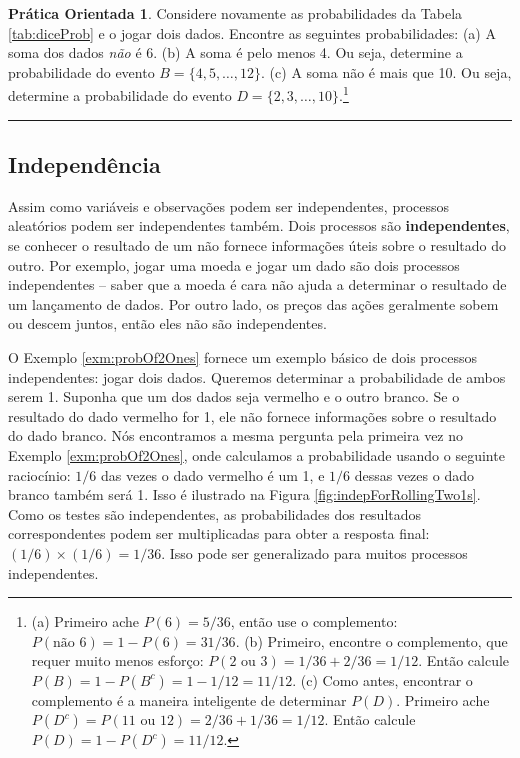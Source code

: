 \documentclass[
]{book}
\theoremstyle{definition}
\theoremstyle{definition}
\theoremstyle{definition}
\newtheorem{exercise}{Prática Orientada}[chapter]
\theoremstyle{definition}
\theoremstyle{remark}
\begin{document}
\begin{exercise}
\protect\hypertarget{exr:unnamed-chunk-54}{}{\label{exr:unnamed-chunk-54} }Considere novamente as probabilidades da Tabela \ref{tab:diceProb} e o jogar dois dados. Encontre as seguintes probabilidades:
(a) A soma dos dados \emph{não} é 6.
(b) A soma é pelo menos 4. Ou seja, determine a probabilidade do evento \(B=\{4, 5, \dots, 12\}\).
(c) A soma não é mais que 10. Ou seja, determine a probabilidade do evento \(D=\{2, 3, \dots, 10\}\).\footnote{(a) Primeiro ache \(P(6)=5/36\), então use o complemento: \(P(\text{não }6) = 1 - P(6) = 31/36\). (b) Primeiro, encontre o complemento, que requer muito menos esforço: \(P(2 \text{ ou } 3)=1/36+2/36=1/12\). Então calcule \(P(B) = 1-P(B^c) = 1-1/12 = 11/12\). (c) Como antes, encontrar o complemento é a maneira inteligente de determinar \(P(D)\). Primeiro ache \(P(D^c) = P(11 \text{ ou } 12)=2/36 + 1/36=1/12\). Então calcule \(P(D) = 1 - P(D^c) = 11/12\).}
\end{exercise}

\begin{center}\rule{0.5\linewidth}{0.5pt}\end{center}

\hypertarget{probabilityIndependence}{%
\subsection{Independência}\label{probabilityIndependence}}

Assim como variáveis e observações podem ser independentes, processos aleatórios podem ser independentes também. Dois processos são \textbf{independentes}, se conhecer o resultado de um não fornece informações úteis sobre o resultado do outro. Por exemplo, jogar uma moeda e jogar um dado são dois processos independentes -- saber que a moeda é cara não ajuda a determinar o resultado de um lançamento de dados. Por outro lado, os preços das ações geralmente sobem ou descem juntos, então eles não são independentes.

O Exemplo \ref{exm:probOf2Ones} fornece um exemplo básico de dois processos independentes: jogar dois dados. Queremos determinar a probabilidade de ambos serem 1. Suponha que um dos dados seja vermelho e o outro branco. Se o resultado do dado vermelho for 1, ele não fornece informações sobre o resultado do dado branco. Nós encontramos a mesma pergunta pela primeira vez no Exemplo \ref{exm:probOf2Ones}, onde calculamos a probabilidade usando o seguinte raciocínio: \(1/6\) das vezes o dado vermelho é um 1, e \(1/6\) dessas vezes o dado branco também será 1. Isso é ilustrado na Figura \ref{fig:indepForRollingTwo1s}. Como os testes são independentes, as probabilidades dos resultados correspondentes podem ser multiplicadas para obter a resposta final: \((1/6)\times(1/6)=1/36\). Isso pode ser generalizado para muitos processos independentes.
\end{document}
